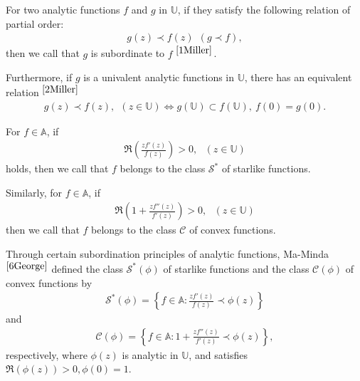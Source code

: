 \documentclass[11pt,twoside, reqno]{article}
\theoremstyle{definition}
\begin{document}
For two analytic functions $f$ and $g$ in $\mathbb{U}$, if they satisfy the following relation of partial order: 
\begin{align}
g(z)\prec f(z)\ \  (g\prec f)\nonumber,
\end{align}
then we call that $g$ is subordinate to $f$ $^{\cite{1Miller}}$.

Furthermore, if $g$ is a univalent analytic functions in $\mathbb{U}$, there has an equivalent relation $^{\cite{2Miller}}$
\begin{align}
g(z)\prec f(z),\ \ (z\in \mathbb{U} )\Leftrightarrow g(\mathbb{U})\subset f(\mathbb{U}),\ f(0)=g(0) \nonumber.
\end{align}

For $f\in \mathbb{A} $, if
\begin{align}
\mathfrak{R} \left ( \frac{z{f}'\left ( z \right )  }{f\left ( z \right ) }  \right ) >0,\ \ \ \left ( z\in \mathbb{U}  \right )  \nonumber
\end{align}
holds, then we call that $f$ belongs to the class $\mathcal{S}^{\ast } $ of starlike functions.


Similarly, for $f\in \mathbb{A} $, if 
\begin{align}
\mathfrak{R} \left (1+ \frac{z{f}'' \left ( z \right )  }{{f}' \left ( z \right ) }  \right ) >0,\ \ \ \left ( z\in \mathbb{U}  \right )  \nonumber
\end{align}
then we call that $f$ belongs to the class $\mathcal{C} $ of convex functions.

Through certain subordination principles of analytic functions, Ma-Minda$^{\cite{6George}}$ defined the class $\mathcal{S}^{\ast } \left ( \phi  \right ) $ of starlike functions and the class $\mathcal{C} \left ( \phi  \right ) $ of convex functions by
\begin{align}
\mathcal{S}^{\ast }  \left ( \phi  \right ) =\left \{ f\in \mathbb{A}:\frac{z{f}'(z) }{f(z)}  \prec \phi (z) \right \} \nonumber
\end{align}
and
\begin{align}
\mathcal{C}\left ( \phi  \right ) =\left \{ f\in \mathbb{A}:1+\frac{z{f}'' (z) }{{f}' (z)}  \prec \phi (z) \right \}, \nonumber
\end{align}
respectively, where $\phi (z)$ is analytic in $\mathbb{U}$, and satisfies $\mathfrak{R} \left ( \phi (z) \right ) >0, \phi (0)=1$.
\end{document}

